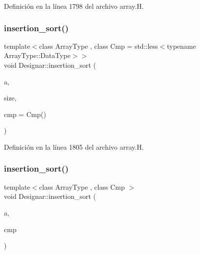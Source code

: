 Definición en la línea 1798 del archivo array.\+H.

\mbox{\label{namespace_designar_a8655d6fa8772dee92565bf7475e5612d}} 
\subsubsection{\texorpdfstring{insertion\+\_\+sort()}{insertion\_sort()}\hspace{0.1cm}{\footnotesize\ttfamily [4/6]}}
{\footnotesize\ttfamily template$<$class Array\+Type , class Cmp  = std\+::less$<$typename Array\+Type\+::\+Data\+Type$>$$>$ \\
void Designar\+::insertion\+\_\+sort (\begin{DoxyParamCaption}\item[{Array\+Type \&}]{a,  }\item[{\hyperlink{namespace_designar_a9d113d66a39e82b73727c72cd3a52f73}{lint\+\_\+t}}]{size,  }\item[{Cmp \&\&}]{cmp = {\ttfamily Cmp()} }\end{DoxyParamCaption})\hspace{0.3cm}{\ttfamily [inline]}}



Definición en la línea 1805 del archivo array.\+H.

\mbox{\label{namespace_designar_ab78e23e3c8eb0365e27244f5de2532d2}} 
\subsubsection{\texorpdfstring{insertion\+\_\+sort()}{insertion\_sort()}\hspace{0.1cm}{\footnotesize\ttfamily [5/6]}}
{\footnotesize\ttfamily template$<$class Array\+Type , class Cmp $>$ \\
void Designar\+::insertion\+\_\+sort (\begin{DoxyParamCaption}\item[{Array\+Type \&}]{a,  }\item[{Cmp \&}]{cmp }\end{DoxyParamCaption})\hspace{0.3cm}{\ttfamily [inline]}}



